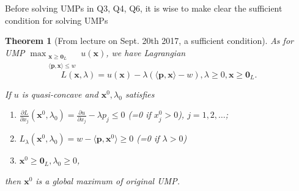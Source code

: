 \documentclass{article}
\makeatletter
\newtheorem{thm}{\bf Theorem}
\newenvironment{subenvir}[1]{%
	\def\subtheoremcounter{#1}%
	\refstepcounter{#1}%
	\protected@edef\theparentnumber{\csname the#1\endcsname}%
	\setcounter{parentnumber}{\value{#1}}%
	\setcounter{#1}{0}%
	\expandafter\def\csname the#1\endcsname{\theparentnumber.\Alph{#1}}%
	\ignorespaces
}{%
	\setcounter{\subtheoremcounter}{\value{parentnumber}}%
	\ignorespacesafterend
}
\newcounter{parentnumber}
\newcommand{\1}{{\bf 1}}
\newcommand{\0}{{\mathbf{0}}}
\newcommand{\p}{{\mathbf{p}}}
\newcommand{\x}{{\mathbf{x}}}
\newcommand{\<}{\langle}
\renewcommand{\>}{\rangle}
\newcommand{\dps}{\displaystyle}
\makeatother
\begin{document}
Before solving UMPs in Q3, Q4, Q6, it is wise to make clear the sufficient condition for solving UMPs 
\begin{mdframed}	\begin{thm}[From lecture on Sept. 20th 2017, a sufficient condition]
		\label{thm:lecture verion of sufficient condition}
	As for UMP $\dps \max_{\substack{\x \ge \0_L \\ \langle  \p ,\x \rangle \le w}} u(\x)$, we have Lagrangian
	$$
	L(\x,\lambda) = u(\x) - \lambda \left( \langle  \p ,\x \rangle - w \right), \lambda \ge 0, \x \ge \0_L.
	$$
	
	If $u$ is quasi-concave and $\x^0,\lambda_0$ satisfies
	\begin{enumerate}[(1)]
		\item $\frac{\partial L}{\partial x_j}(\x^0,\lambda_0) = \frac{\partial u}{\partial x_j} - \lambda p_j \le 0$ (=0 if $x_j ^0>0 $), $j =1,2,\ldots$;
		\item $L_{\lambda} (\x^0,\lambda_0)  = w -  \langle  \p ,\x^0 \rangle  \ge 0 $ (=0 if $\lambda >0$)
		\item $ \x^0 \ge \0_L, \lambda_0 \ge 0$,
	\end{enumerate}
then $\x^0$ is a global maximum of original UMP.
		
\end{thm}
\end{mdframed}
\end{document}
